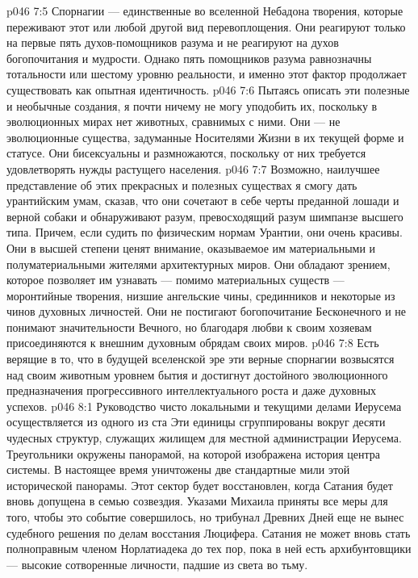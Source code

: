 \vs p046 7:5 Спорнагии --- единственные во вселенной Небадона творения, которые переживают этот или любой другой вид перевоплощения. Они реагируют только на первые пять духов\hyp{}помощников разума и не реагируют на духов богопочитания и мудрости. Однако пять помощников разума равнозначны тотальности или шестому уровню реальности, и именно этот фактор продолжает существовать как опытная идентичность.
\vs p046 7:6 \pc Пытаясь описать эти полезные и необычные создания, я почти ничему не могу уподобить их, поскольку в эволюционных мирах нет животных, сравнимых с ними. Они --- не эволюционные существа, задуманные Носителями Жизни в их текущей форме и статусе. Они бисексуальны и размножаются, поскольку от них требуется удовлетворять нужды растущего населения.
\vs p046 7:7 Возможно, наилучшее представление об этих прекрасных и полезных существах я смогу дать урантийским умам, сказав, что они сочетают в себе черты преданной лошади и верной собаки и обнаруживают разум, превосходящий разум шимпанзе высшего типа. Причем, если судить по физическим нормам Урантии, они очень красивы. Они в высшей степени ценят внимание, оказываемое им материальными и полуматериальными жителями архитектурных миров. Они обладают зрением, которое позволяет им узнавать --- помимо материальных существ --- моронтийные творения, низшие ангельские чины, срединников и некоторые из чинов духовных личностей. Они не постигают богопочитание Бесконечного и не понимают значительности Вечного, но благодаря любви к своим хозяевам присоединяются к внешним духовным обрядам своих миров.
\vs p046 7:8 \pc Есть верящие в то, что в будущей вселенской эре эти верные спорнагии возвысятся над своим животным уровнем бытия и достигнут достойного эволюционного предназначения прогрессивного интеллектуального роста и даже духовных успехов.
\vs p046 8:1 Руководство чисто локальными и текущими делами Иерусема осуществляется из одного из ста  Эти единицы сгруппированы вокруг десяти чудесных структур, служащих жилищем для местной администрации Иерусема. Треугольники окружены панорамой, на которой изображена история центра системы. В настоящее время уничтожены две стандартные мили этой исторической панорамы. Этот сектор будет восстановлен, когда Сатания будет вновь допущена в семью созвездия. Указами Михаила приняты все меры для того, чтобы это событие совершилось, но трибунал Древних Дней еще не вынес судебного решения по делам восстания Люцифера. Сатания не может вновь стать полноправным членом Норлатиадека до тех пор, пока в ней есть архибунтовщики --- высокие сотворенные личности, падшие из света во тьму.
